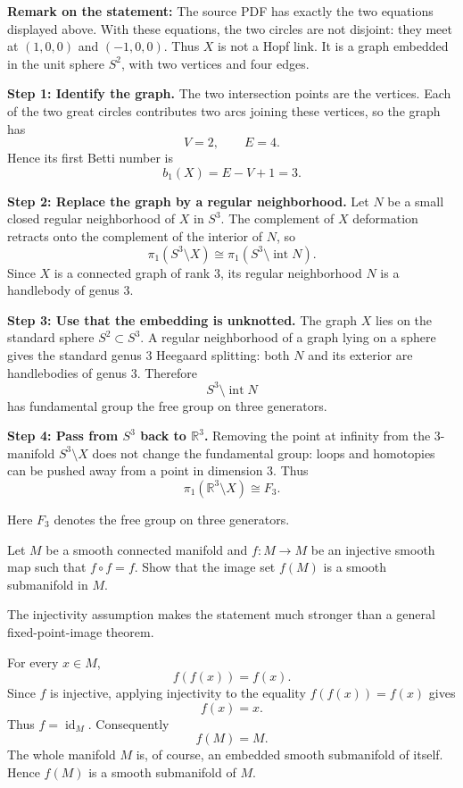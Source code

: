 \begin{solution}
\textbf{Remark on the statement:} The source PDF has exactly the two equations displayed above. With these equations, the two circles are not disjoint: they meet at $(1,0,0)$ and $(-1,0,0)$. Thus $X$ is not a Hopf link. It is a graph embedded in the unit sphere $S^2$, with two vertices and four edges.

\textbf{Step 1: Identify the graph.}
The two intersection points are the vertices. Each of the two great circles contributes two arcs joining these vertices, so the graph has
\[
V=2,\qquad E=4.
\]
Hence its first Betti number is
\[
b_1(X)=E-V+1=3.
\]

\textbf{Step 2: Replace the graph by a regular neighborhood.}
Let $N$ be a small closed regular neighborhood of $X$ in $S^3$. The complement of $X$ deformation retracts onto the complement of the interior of $N$, so
\[
\pi_1(S^3\setminus X)\cong \pi_1(S^3\setminus \operatorname{int}N).
\]
Since $X$ is a connected graph of rank $3$, its regular neighborhood $N$ is a handlebody of genus $3$.

\textbf{Step 3: Use that the embedding is unknotted.}
The graph $X$ lies on the standard sphere $S^2\subset S^3$. A regular neighborhood of a graph lying on a sphere gives the standard genus $3$ Heegaard splitting: both $N$ and its exterior are handlebodies of genus $3$. Therefore
\[
S^3\setminus \operatorname{int}N
\]
has fundamental group the free group on three generators.

\textbf{Step 4: Pass from $S^3$ back to $\mathbb{R}^3$.}
Removing the point at infinity from the $3$-manifold $S^3\setminus X$ does not change the fundamental group: loops and homotopies can be pushed away from a point in dimension $3$. Thus
\[
\pi_1(\mathbb{R}^3\setminus X)\cong F_3.
\]

Here $F_3$ denotes the free group on three generators.
\end{solution}

\begin{exercise}
\label{geometry:2013:8}
Let $M$ be a smooth connected manifold and $f : M \to M$ be an injective smooth map such that $f \circ f = f$. Show that the image set $f(M)$ is a smooth submanifold in $M$.
\end{exercise}

\begin{solution}
The injectivity assumption makes the statement much stronger than a general fixed-point-image theorem.

For every $x\in M$,
\[
f(f(x))=f(x).
\]
Since $f$ is injective, applying injectivity to the equality $f(f(x))=f(x)$ gives
\[
f(x)=x.
\]
Thus $f=\operatorname{id}_M$. Consequently
\[
f(M)=M.
\]
The whole manifold $M$ is, of course, an embedded smooth submanifold of itself. Hence $f(M)$ is a smooth submanifold of $M$.
\end{solution}


